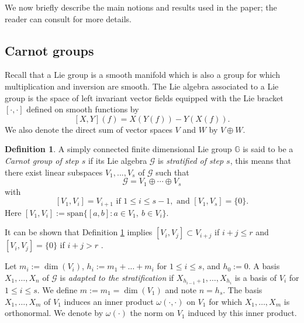 \documentclass[reqno, 11pt]{amsart}
\theoremstyle{definition}
\newtheorem{definition}[theorem]{Definition}
\theoremstyle{remark}
\numberwithin{theorem}{section}
\numberwithin{equation}{section}
\begin{document}
We now briefly describe the main notions and results used in the paper; the reader can consult \cite{BLU} for more details. 

\subsection{Carnot groups}

Recall that a Lie group is a smooth manifold which is also a group for which multiplication and inversion are smooth. The Lie algebra associated to a Lie group is the space of left invariant vector fields equipped with the Lie bracket $[\cdot, \cdot]$ defined on smooth functions by
\[[X,Y](f)=X(Y(f))-Y(X(f)).\]
We also denote the direct sum of vector spaces $V$ and $W$ by $V\oplus W$.

\begin{definition}\label{Carnotdef}
A simply connected finite dimensional Lie group ${\mathbb{G}}$ is said to be a \emph{Carnot group of step $s$} if its Lie algebra $\mathcal{G}$ is \emph{stratified of step $s$}, this means that there exist linear subspaces $V_1,...,V_s$ of $\mathcal{G}$ such that
\[\mathcal{G}=V_1\oplus \cdots \oplus V_s\]
with
\[[V_1,V_{i}]=V_{i+1} \mbox{ if }1\leq i\leq s-1, \mbox{ and } [V_1,V_s]=\{0\}.\]
Here $[V_1,V_i]:=\mathrm{span}\{[a,b]: a\in V_1,\ b\in V_i\}.$
\end{definition}

It can be shown that Definition \ref{Carnotdef} implies $[V_{i},V_{j}]\subset V_{i+j}$ if $i+j\leq r$ and $[V_{i},V_{j}]=\{0\}$ if $i+j>r$ \cite[Proposition 1.1.7]{BLU}. 

Let $m_i:=\dim(V_i)$, $h_i:=m_1+\dots +m_i$ for $1\leq i\leq s$, and $h_{0}:=0$. A basis $X_1,\ldots, X_n$ of $\mathcal{G}$ is \emph{adapted to the stratification} if $X_{h_{i-1}+1},\ldots, X_{h_{i}}$ is a basis of $V_i$ for $1\leq i \leq s$. We define $m:=m_1=\dim(V_{1})$ and note $n=h_s$. The basis $X_{1}, \ldots, X_{m}$ of $V_{1}$ induces an inner product $\omega(\cdot,\cdot)$ on $V_1$ for which $X_{1}, \ldots, X_{m}$ is orthonormal. We denote by $\omega (\cdot)$ the norm on $V_{1}$ induced by this inner product.
\end{document}
